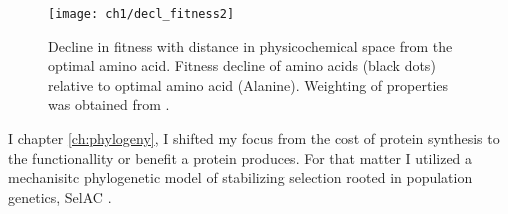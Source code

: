 \begin{figure}[H]
     \centering
	\texttt{[image: ch1/decl\_fitness2]}
	\caption{Decline in fitness with distance in physicochemical space from the optimal amino acid. 
	Fitness decline of amino acids (black dots) relative to optimal amino acid (Alanine). Weighting of properties was obtained from \citet{grantham1974}.}
	\label{fig:decl_fit}
\end{figure}


I chapter \ref{ch:phylogeny}, I shifted my focus from the cost of protein synthesis to the functionallity or benefit a protein produces.
For that matter I utilized a mechanisitc phylogenetic model of stabilizing selection rooted in population genetics, SelAC \cite{beaulieu2018}.









